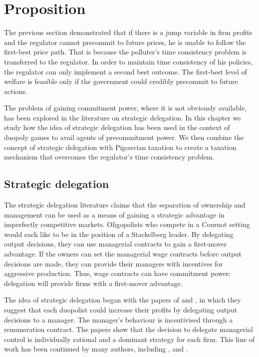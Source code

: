 \chapter{Proposition}

\label{cha:proposition}

The previous section demonstrated that if there is a jump variable in firm
profits and the regulator cannot precommit to future prices, he is unable to
follow the first-best price path. That is because the polluter's time
consistency problem is transferred to the regulator. In order to maintain
time consistency of his policies, the regulator can only implement a second
best outcome. The first-best level of welfare is feasible only if the
government could credibly precommit to future actions.

The problem of gaining commitment power, where it is not obviously
available, has been explored in the literature on strategic delegation. In
this chapter we study how the idea of strategic delegation has been used in
the context of duopoly games to avail agents of precommitment power. We then
combine the concept of strategic delegation with Pigouvian taxation to
create a taxation mechanism that overcomes the regulator's time consistency
problem.

\section{Strategic delegation}

\label{sec:strategic-delegation}

The strategic delegation literature claims that the separation of ownership
and management can be used as a means of gaining a strategic advantage in
imperfectly competitive markets. Oligopolists who compete in a Cournot
setting would each like to be in the position of a Stackelberg leader. By
delegating output decisions, they can use managerial contracts to gain a
first-mover advantage. If the owners can set the managerial wage contracts
before output decisions are made, they can provide their managers with
incentives for aggressive production. Thus, wage contracts can have
commitment power: delegation will provide firms with a first-mover advantage.

The idea of strategic delegation began with the papers of \citet{Sklivas1987}
and \citet{Fershtman1987}, in which they suggest that each duopolist could
increase their profits by delegating output decisions to a manager. The
manager's behaviour is incentivised through a remuneration contract. The
papers show that the decision to delegate managerial control is individually
rational and a dominant strategy for each firm. This line of work has been
continued by many authors, including \citet{Miller2001}, \citet{Basu1993}
and \citet{Baye1996}.

